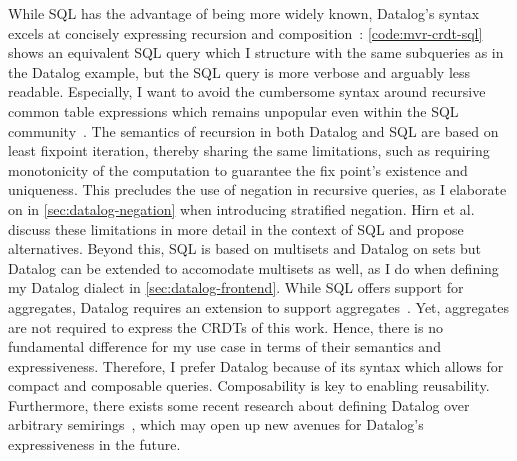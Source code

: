 While SQL has the advantage of being more widely known,
Datalog's syntax excels at concisely expressing recursion and
composition~\cite{abo2024convergence}:
\ref{code:mvr-crdt-sql} shows an equivalent SQL query which I structure
with the same subqueries as in the Datalog example,
but the SQL query is more verbose and arguably less readable.
Especially, I want to avoid the cumbersome syntax around recursive
common table expressions which remains unpopular even within the SQL
community~\cite{neumann2024critique, hirn2023fix, mcsherry2022recursion}.
The semantics of recursion in both Datalog and SQL are based on least
fixpoint iteration, thereby sharing the same limitations, such as requiring
monotonicity of the computation to guarantee the fix point's existence
and uniqueness. This precludes the use of negation in recursive queries,
as I elaborate on in \ref{sec:datalog-negation} when introducing stratified
negation.
Hirn et al. \cite{hirn2023fix} discuss these limitations in more detail
in the context of SQL and propose alternatives.
Beyond this, SQL is based on multisets and Datalog on sets but Datalog can
be extended to accomodate multisets as well, as I do when defining
my Datalog dialect in \ref{sec:datalog-frontend}.
While SQL offers support for aggregates,
Datalog requires an extension to support aggregates~\cite{green2013datalog}.
Yet, aggregates are not required to express the \acp{CRDT} of this work.
Hence, there is no fundamental difference for my use case
in terms of their semantics and expressiveness.
Therefore, I prefer Datalog because of its syntax which allows for compact
and composable queries. Composability is key to enabling reusability.
Furthermore, there exists some recent research about defining Datalog
over arbitrary semirings~\cite{abo2024convergence, khamis2022datalog},
which may open up new avenues for Datalog's expressiveness in the future.


